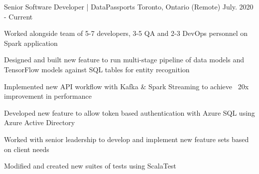 \begin{cventries}

    {Senior Software Developer | DataPassports}
    {Toronto, Ontario (Remote)}
    {July. 2020 - Current}
    {
      \begin{cvitems}
	\item {Worked alongside team of 5-7 developers, 3-5 QA and 2-3 DevOps personnel on Spark application}
        \item {Designed and built new feature to run multi-stage pipeline of data models and TensorFlow models against SQL tables for entity recognition}
	\item{Implemented new API workflow with Kafka \& Spark Streaming to achieve ~20x improvement in performance}
        \item {Developed new feature to allow token based authentication with Azure SQL using Azure Active Directory}
        \item {Worked with senior leadership to develop and implement new feature sets based on client needs}
	\item {Modified and created new suites of tests using ScalaTest}
      \end{cvitems}
    }


\end{cventries}
